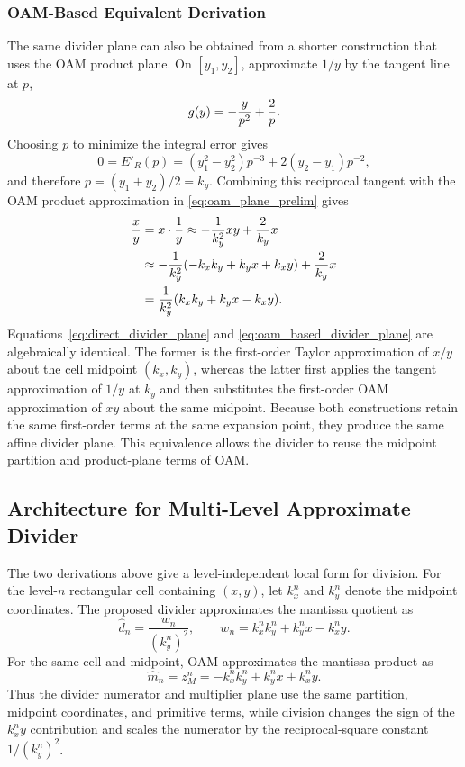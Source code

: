 \documentclass[conference]{IEEEtran}
\begin{document}
\subsubsection{OAM-Based Equivalent Derivation}
The same divider plane can also be obtained from a shorter construction that
uses the OAM product plane. On $[y_1,y_2]$, approximate $1/y$ by the tangent
line at $p$,
\begin{equation}
g(y)=-{y\over p^2}+{2\over p}.
\end{equation}
Choosing $p$ to minimize the integral error gives
\begin{equation}
0=E'_R(p)=(y_1^2-y_2^2)p^{-3}+2(y_2-y_1)p^{-2},
\end{equation}
and therefore $p=(y_1+y_2)/2=k_y$. Combining this reciprocal tangent with the
OAM product approximation in \eqref{eq:oam_plane_prelim} gives
\begin{equation}
\begin{aligned}
{x\over y}
&=x\cdot{1\over y}
\approx -{1\over k_y^2}xy+{2\over k_y}x \\
&\approx -{1\over k_y^2}(-k_xk_y+k_yx+k_xy)+{2\over k_y}x \\
&={1\over k_y^2}(k_xk_y+k_yx-k_xy).
\end{aligned}
\label{eq:oam_based_divider_plane}
\end{equation}
Equations~\eqref{eq:direct_divider_plane} and
\eqref{eq:oam_based_divider_plane} are algebraically identical. The former is
the first-order Taylor approximation of $x/y$ about the cell midpoint
$(k_x,k_y)$, whereas the latter first applies the tangent approximation of
$1/y$ at $k_y$ and then substitutes the first-order OAM approximation of $xy$
about the same midpoint. Because both constructions retain the same first-order
terms at the same expansion point, they produce the same affine divider plane.
This equivalence allows the divider to reuse the midpoint partition and
product-plane terms of OAM.

\subsection{Architecture for Multi-Level Approximate Divider}
The two derivations above give a level-independent local form for division.
For the level-$n$ rectangular cell containing $(x,y)$, let $k_x^n$ and
$k_y^n$ denote the midpoint coordinates. The proposed divider approximates the mantissa quotient
as
\begin{equation}
 \widehat{d}_n=\frac{w_n}{(k_y^n)^2},\qquad
 w_n=k_x^nk_y^n+k_y^nx-k_x^ny. \label{eq:divplane}
\end{equation}
For the same cell and midpoint, OAM approximates the mantissa product as
\begin{equation}
 \widehat{m}_n=z_M^n=-k_x^nk_y^n+k_y^nx+k_x^ny. \label{eq:mulplane}
\end{equation}
Thus the divider numerator and multiplier plane use the same partition,
midpoint coordinates, and primitive terms, while division changes the sign of
the $k_x^ny$ contribution and scales the numerator by the reciprocal-square
constant $1/(k_y^n)^2$.
\end{document}
